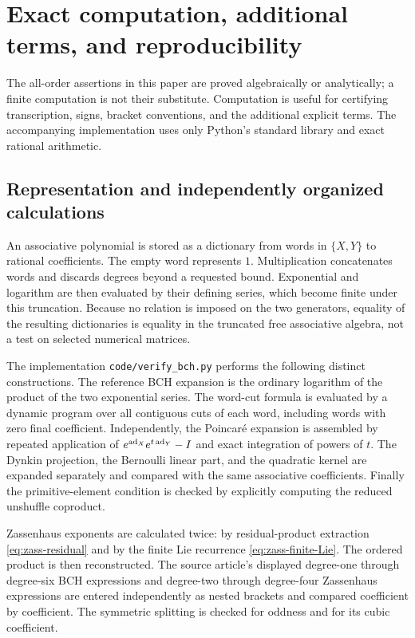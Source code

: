 \section{Exact computation, additional terms, and reproducibility}\label{sec:computation}
The all-order assertions in this paper are proved algebraically or analytically; a finite computation is not their substitute. Computation is useful for certifying transcription, signs, bracket conventions, and the additional explicit terms. The accompanying implementation uses only Python's standard library and exact rational arithmetic.

\subsection{Representation and independently organized calculations}
An associative polynomial is stored as a dictionary from words in $\{X,Y\}$ to rational coefficients. The empty word represents $1$. Multiplication concatenates words and discards degrees beyond a requested bound. Exponential and logarithm are then evaluated by their defining series, which become finite under this truncation. Because no relation is imposed on the two generators, equality of the resulting dictionaries is equality in the truncated free associative algebra, not a test on selected numerical matrices.

The implementation \texttt{code/verify\_bch.py} performs the following distinct constructions. The reference BCH expansion is the ordinary logarithm of the product of the two exponential series. The word-cut formula is evaluated by a dynamic program over all contiguous cuts of each word, including words with zero final coefficient. Independently, the Poincar\'e expansion is assembled by repeated application of $e^{\operatorname{ad}_X}e^{t\operatorname{ad}_Y}-I$ and exact integration of powers of $t$. The Dynkin projection, the Bernoulli linear part, and the quadratic kernel are expanded separately and compared with the same associative coefficients. Finally the primitive-element condition is checked by explicitly computing the reduced unshuffle coproduct.

Zassenhaus exponents are calculated twice: by residual-product extraction \cref{eq:zass-residual} and by the finite Lie recurrence \cref{eq:zass-finite-Lie}. The ordered product is then reconstructed. The source article's displayed degree-one through degree-six BCH expressions and degree-two through degree-four Zassenhaus expressions are entered independently as nested brackets and compared coefficient by coefficient. The symmetric splitting is checked for oddness and for its cubic coefficient.

